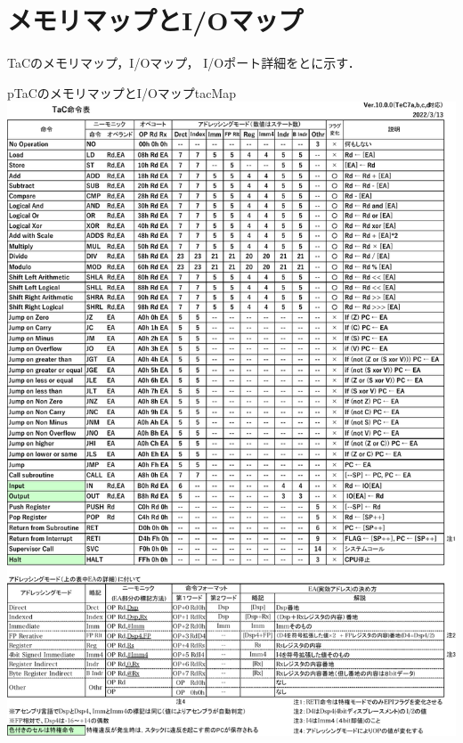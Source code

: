 \section{メモリマップとI/Oマップ}
TaCのメモリマップ，I/Oマップ，
I/Oポート詳細をとに示す．

\begin{myfig}{p}{TaCのメモリマップとI/Oマップ}{tacMap}
  \includegraphics[scale=0.86,page=4]{Fig/TaCInst-crop.pdf}
\end{myfig}

